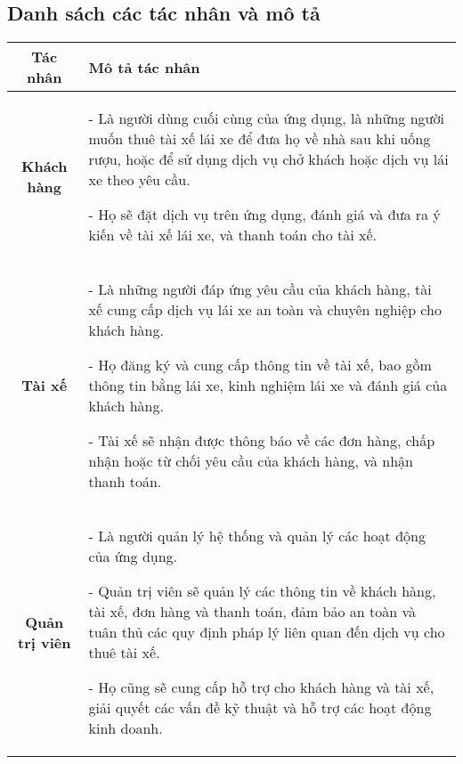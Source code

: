 \documentclass[a4paper,13pt]{report}
\numberwithin{figure}{chapter}
\numberwithin{figure}{section}
\begin{document}
\subsection{Danh sách các tác nhân và mô tả}
\begin{table}[H]
  \centering
  \renewcommand{\arraystretch}{2.5}
  \begin{tabular}{|c|p{13.8cm}|}
  \hline
  \textbf{Tác nhân} & \textbf{Mô tả tác nhân} \\
  \hline
  \centering\textbf{Khách hàng} & - Là người dùng cuối cùng của ứng dụng, là những người muốn thuê tài xế lái xe để đưa họ về nhà sau khi uống rượu, hoặc để sử dụng dịch vụ chở khách hoặc dịch vụ lái xe theo yêu cầu. 
  \par - Họ sẽ đặt dịch vụ trên ứng dụng, đánh giá và đưa ra ý kiến về tài xế lái xe, và thanh toán cho tài xế. \\
  \hline
  \centering\textbf{Tài xế} & - Là những người đáp ứng yêu cầu của khách hàng, tài xế cung cấp dịch vụ lái xe an toàn và chuyên nghiệp cho khách hàng. 
  \par - Họ đăng ký và cung cấp thông tin về tài xế, bao gồm thông tin bằng lái xe, kinh nghiệm lái xe và đánh giá của khách hàng. 
  \par - Tài xế sẽ nhận được thông báo về các đơn hàng, chấp nhận hoặc từ chối yêu cầu của khách hàng, và nhận thanh toán. \\
  \hline
  \centering\textbf{Quản trị viên} & - Là người quản lý hệ thống và quản lý các hoạt động của ứng dụng. 
  \par - Quản trị viên sẽ quản lý các thông tin về khách hàng, tài xế, đơn hàng và thanh toán, đảm bảo an toàn và tuân thủ các quy định pháp lý liên quan đến dịch vụ cho thuê tài xế. 
  \par - Họ cũng sẽ cung cấp hỗ trợ cho khách hàng và tài xế, giải quyết các vấn đề kỹ thuật và hỗ trợ các hoạt động kinh doanh. \\
  \hline
  \end{tabular}
  \end{table}
  
\end{document}

